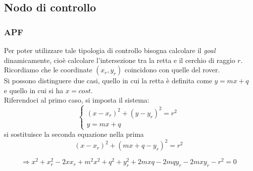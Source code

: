 \subsection{Nodo di controllo}
\subsubsection{APF}
Per poter utilizzare tale tipologia di controllo bisogna calcolare il \textit{goal} dinamicamente, cioè calcolare l'intersezione tra la retta e il cerchio di raggio $r$. Ricordiamo che le coordinate $(x_r,y_r)$ coincidono con quelle del rover. \\
Si possono distinguere due casi, quello in cui la retta è definita come $y=mx+q$ e quello in cui si ha $x=cost$.\\
Riferendoci al primo caso, si imposta il sistema:
\begin{equation} 
\begin{cases}

    (x-x_r)^2+(y-y_r)^2=r^2
   \\
    y=mx+q 
  \end{cases} 
\end{equation}
si sostituisce la seconda equazione nella prima
\begin{equation*}
(x-x_r)^2+(mx+q-y_r)^2=r^2
\end{equation*}

\begin{equation}
\Rightarrow x^2+x_r^2-2xx_r+m^2x^2+q^2+y_r^2+2mxq-2mqy_r-2mxy_r-r^2=0
\end{equation}

